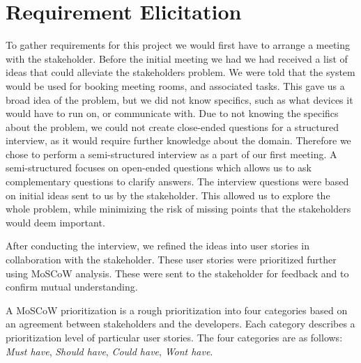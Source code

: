 \section{Requirement Elicitation}\label{sec:requirement_elicitation}

% 

To gather requirements for this project we would first have to arrange a meeting with the stakeholder. 
Before the initial meeting we had we had received a list of ideas that could alleviate the stakeholders problem.
We were told that the system would be used for booking meeting rooms, and associated tasks. 
This gave us a broad idea of the problem, but we did not know specifics, such as what devices it would have to run on, or communicate with.
Due to not knowing the specifics about the problem, we could not create close-ended questions for a structured interview, as it would require further knowledge about the domain.
Therefore we chose to perform a semi-structured interview as a part of our first meeting.
A semi-structured focuses on open-ended questions which allows us to ask complementary questions to clarify answers. 
The interview questions were based on initial ideas sent to us by the stakeholder. 
This allowed us to explore the whole problem, while minimizing the risk of missing points that the stakeholders would deem important. \cite{InterviewsNHS}



After conducting the interview, we refined the ideas into user stories in collaboration with the stakeholder. These user stories were prioritized further using MoSCoW analysis\cite{DEBbook}.
These were sent to the stakeholder for feedback and to confirm mutual understanding.

A MoSCoW prioritization is a rough prioritization into four categories based on an agreement between stakeholders and the developers.
Each category describes a prioritization level of particular user stories. The four categories are as follows: \textit{Must have}, \textit{Should have}, \textit{Could have}, \textit{Wont have}.

